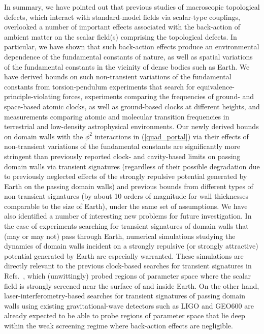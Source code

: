 \documentclass[aps,prd,onecolumn,nofootinbib]{revtex4-2} %
\begin{document}
In summary, we have pointed out that previous studies of macroscopic topological defects, which interact with standard-model fields via scalar-type couplings, overlooked a number of important effects associated with the back-action of ambient matter on the scalar field(s) comprising the topological defects. 
In particular, we have shown that such back-action effects produce an environmental dependence of the fundamental constants of nature, as well as spatial variations of the fundamental constants in the vicinity of dense bodies such as Earth. 
We have derived bounds on such non-transient variations of the fundamental constants from torsion-pendulum experiments that search for equivalence-principle-violating forces, experiments comparing the frequencies of ground- and space-based atomic clocks, as well as ground-based clocks at different heights, and measurements comparing atomic and molecular transition frequencies in terrestrial and low-density astrophysical environments. 
Our newly derived bounds on domain walls with the $\phi^2$ interactions in (\ref{quad_portal}) via their effects of non-transient variations of the fundamental constants are significantly more stringent than previously reported clock- and cavity-based limits on passing domain walls via transient signatures \cite{Wcislo_2016_TDM-cavity,Roberts_2017_TDM-GPS,Wcislo_2018_TDM-cavity,Roberts_2019_TDM-clocks} (regardless of their possible degradation due to previously neglected effects of the strongly repulsive potential generated by Earth on the passing domain walls) and previous bounds from different types of non-transient signatures (by about 10 orders of magnitude for wall thicknesses comparable to the size of Earth), under the same set of assumptions. 
We have also identified a number of interesting new problems for future investigation. 
In the case of experiments searching for transient signatures of domain walls that (may or may not) pass through Earth, numerical simulations studying the dynamics of domain walls incident on a strongly repulsive (or strongly attractive) potential generated by Earth are especially warranted. 
These simulations are directly relevant to the previous clock-based searches for transient signatures in Refs.~\cite{Wcislo_2016_TDM-cavity,Roberts_2017_TDM-GPS,Wcislo_2018_TDM-cavity,Roberts_2019_TDM-clocks}, which (unwittingly) probed regions of parameter space where the scalar field is strongly screened near the surface of and inside Earth. 
On the other hand, laser-interferometry-based searches for transient signatures of passing domain walls using existing gravitational-wave detectors such as LIGO and GEO600 \cite{Stadnik_2019_DM-LIFO} are already expected to be able to probe regions of parameter space that lie deep within the weak screening regime where back-action effects are negligible. 
\end{document}
